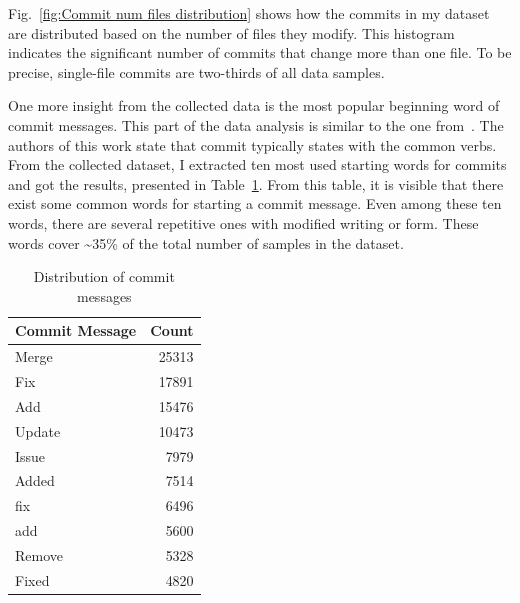 Fig.~{}\ref{fig:Commit num files distribution} shows how the commits in my dataset are distributed based on the number of files they modify. This histogram indicates the significant number of commits that change more than one file. To be precise, single-file commits are two-thirds of all data samples. 

One more insight from the collected data is the most popular beginning word of commit messages. This part of the data analysis is similar to the one from~{}\cite{jung2021commitbert}. The authors of this work state that commit typically states with the common verbs. From the collected dataset, I extracted ten most used starting words for commits and got the results, presented in Table~{}\ref{tab:commit_messages}. From this table, it is visible that there exist some common words for starting a commit message. Even among these ten words, there are several repetitive ones with modified writing or form. These words cover \textasciitilde{}35\% of the total number of samples in the dataset.
\begin{table}[h]
    \centering
    \begin{tabular}{|l|r|} %
    \hline %
    \textbf{Commit Message} & \textbf{Count} \\ 
    \hline %
    Merge     & 25313 \\ \hline %
    Fix       & 17891 \\ \hline %
    Add       & 15476 \\ \hline %
    Update    & 10473 \\ \hline %
    Issue     & 7979  \\ \hline %
    Added     & 7514  \\ \hline %
    fix       & 6496  \\ \hline %
    add       & 5600  \\ \hline %
    Remove    & 5328  \\ \hline %
    Fixed     & 4820  \\ \hline %
    \end{tabular}
    \caption{Distribution of commit messages}\label{tab:commit_messages}
\end{table}

